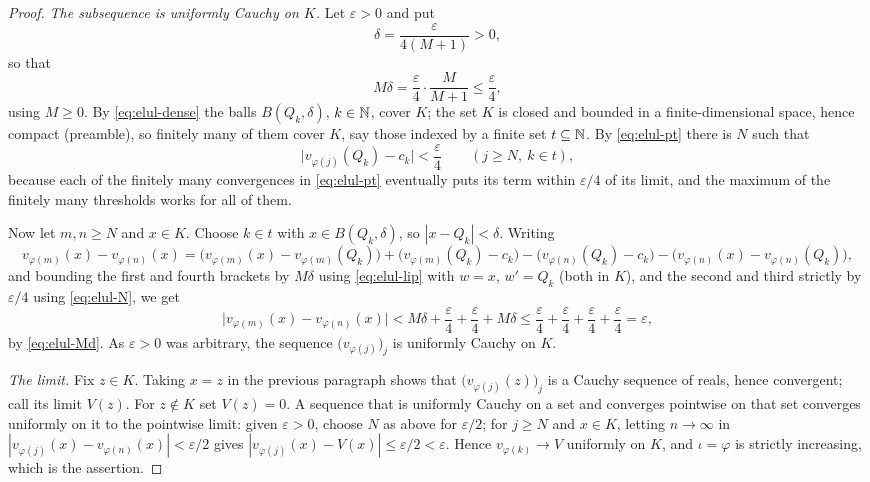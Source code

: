 \begin{proof}
\emph{The subsequence is uniformly Cauchy on $K$.} Let $\varepsilon>0$ and put
\[
  \delta=\frac{\varepsilon}{4(M+1)}>0,
\]
so that
\begin{equation}\label{eq:elul-Md}
  M\delta=\frac{\varepsilon}{4}\cdot\frac{M}{M+1}\le\frac\varepsilon4 ,
\end{equation}
using $M\ge0$. By \eqref{eq:elul-dense} the balls $B(Q_k,\delta)$, $k\in\mathbb{N}$,
cover $K$; the set $K$ is closed and bounded in a finite-dimensional space,
hence compact (preamble), so finitely many of them cover $K$, say those indexed
by a finite set $t\subseteq\mathbb{N}$. By \eqref{eq:elul-pt} there is $N$ such that
\begin{equation}\label{eq:elul-N}
  \bigl|v_{\varphi(j)}(Q_k)-c_k\bigr|<\frac\varepsilon4
  \qquad(j\ge N,\ k\in t),
\end{equation}
because each of the finitely many convergences in \eqref{eq:elul-pt} eventually
puts its term within $\varepsilon/4$ of its limit, and the maximum of the
finitely many thresholds works for all of them.

Now let $m,n\ge N$ and $x\in K$. Choose $k\in t$ with $x\in B(Q_k,\delta)$, so
$|x-Q_k|<\delta$. Writing
\[
  v_{\varphi(m)}(x)-v_{\varphi(n)}(x)
  =\bigl(v_{\varphi(m)}(x)-v_{\varphi(m)}(Q_k)\bigr)
   +\bigl(v_{\varphi(m)}(Q_k)-c_k\bigr)
   -\bigl(v_{\varphi(n)}(Q_k)-c_k\bigr)
   -\bigl(v_{\varphi(n)}(x)-v_{\varphi(n)}(Q_k)\bigr),
\]
and bounding the first and fourth brackets by $M\delta$ using
\eqref{eq:elul-lip} with $w=x$, $w'=Q_k$ (both in $K$), and the second and third
strictly by $\varepsilon/4$ using \eqref{eq:elul-N}, we get
\[
  \bigl|v_{\varphi(m)}(x)-v_{\varphi(n)}(x)\bigr|
   <M\delta+\frac\varepsilon4+\frac\varepsilon4+M\delta
   \le\frac\varepsilon4+\frac\varepsilon4+\frac\varepsilon4+\frac\varepsilon4
   =\varepsilon,
\]
by \eqref{eq:elul-Md}. As $\varepsilon>0$ was arbitrary, the sequence
$\bigl(v_{\varphi(j)}\bigr)_j$ is uniformly Cauchy on $K$.

\emph{The limit.} Fix $z\in K$. Taking $x=z$ in the previous paragraph shows
that $\bigl(v_{\varphi(j)}(z)\bigr)_j$ is a Cauchy sequence of reals, hence
convergent; call its limit $V(z)$. For $z\notin K$ set $V(z)=0$. A sequence that
is uniformly Cauchy on a set and converges pointwise on that set converges
uniformly on it to the pointwise limit: given $\varepsilon>0$, choose $N$ as
above for $\varepsilon/2$; for $j\ge N$ and $x\in K$, letting $n\to\infty$ in
$|v_{\varphi(j)}(x)-v_{\varphi(n)}(x)|<\varepsilon/2$ gives
$|v_{\varphi(j)}(x)-V(x)|\le\varepsilon/2<\varepsilon$. Hence
$v_{\varphi(k)}\to V$ uniformly on $K$, and $\iota=\varphi$ is strictly
increasing, which is the assertion.
\end{proof}
